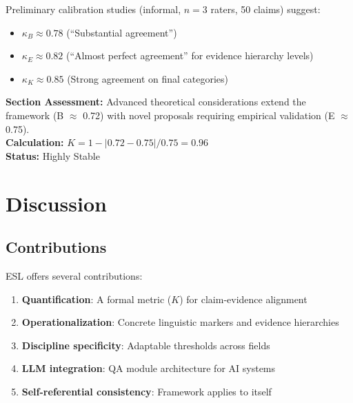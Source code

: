 \documentclass[11pt,a4paper]{article}
\begin{document}
Preliminary calibration studies (informal, $n = 3$ raters, 50 claims) suggest:
\begin{itemize}
    \item $\kappa_B \approx 0.78$ (``Substantial agreement'')
    \item $\kappa_E \approx 0.82$ (``Almost perfect agreement'' for evidence hierarchy levels)
    \item $\kappa_K \approx 0.85$ (Strong agreement on final categories)
\end{itemize}

\begin{eslbox}
\textbf{Section Assessment:} Advanced theoretical considerations extend the framework (B $\approx$ 0.72) with novel proposals requiring empirical validation (E $\approx$ 0.75). \\[0.3em]
\textbf{Calculation:} $K = 1 - |0.72 - 0.75| / 0.75 = 0.96$ \\
\textbf{Status:} Highly Stable
\end{eslbox}

\section{Discussion}
\label{sec:discussion}


\subsection{Contributions}

ESL offers several contributions:

\begin{enumerate}
    \item \textbf{Quantification}: A formal metric ($K$) for claim-evidence alignment
    \item \textbf{Operationalization}: Concrete linguistic markers and evidence hierarchies
    \item \textbf{Discipline specificity}: Adaptable thresholds across fields
    \item \textbf{LLM integration}: QA module architecture for AI systems
    \item \textbf{Self-referential consistency}: Framework applies to itself
\end{enumerate}
\end{document}
